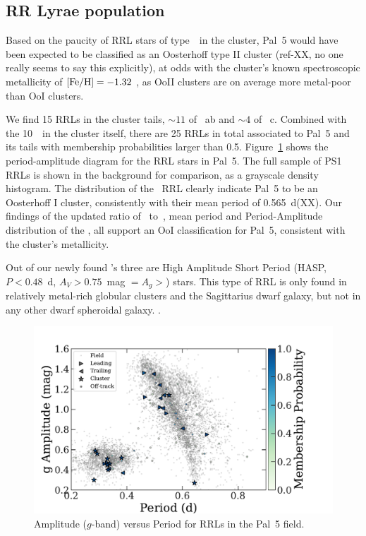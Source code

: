 \documentclass[twocolumn]{aastex63}
\begin{document}
\subsection{RR Lyrae population }

Based on the paucity of RRL stars of type~\typeab~in the cluster, Pal~5  would have been expected to be classified as an Oosterhoff type II cluster (ref-XX, no one really seems to say this explicitly), at odds with the cluster's known spectroscopic metallicity of $[\mathrm{Fe}/\mathrm{H}]=-1.32$ \citep{Kuijsen2018}, as OoII clusters are on average more metal-poor than OoI clusters.

We find 15 RRLs in the cluster tails, $\sim11$ of \type~ab and $\sim4$ of \type~c. Combined with the 10~\rrc~in the cluster itself, there are 25 RRLs in total associated to Pal~5 and its tails with membership probabilities larger than 0.5. Figure~\ref{fig:PA_diagram} shows the period-amplitude diagram for the RRL stars in Pal~5. The full sample of PS1 RRLs is shown in the background for comparison, as a grayscale density histogram. The distribution of the \typeab~RRL clearly indicate Pal~5 to be an Oosterhoff I cluster, consistently with their mean period of 0.565~d(XX).  Our findings of the updated ratio of \rrab~to~\rrc, mean period and Period-Amplitude distribution of the \rrab, all support an OoI classification for Pal~5, consistent with the cluster's metallicity.

Out of our newly found \rrab's three are High Amplitude Short Period (HASP, $P <0.48$~d, $A_V>0.75$~mag $=A_g>$) stars. This type of RRL is only found in relatively metal-rich globular clusters  \citep[$\Feh>-1.5$][]{Monelli2017} and the Sagittarius dwarf galaxy, but not in any other dwarf spheroidal galaxy. .


\begin{figure}
\begin{center}
\includegraphics[width=\columnwidth]{paper/rrls_PA.pdf}
\caption{Amplitude ($g$-band) versus Period for RRLs in the Pal~5 field.}\label{fig:PA_diagram}
\end{center}
\end{figure}
\end{document}
